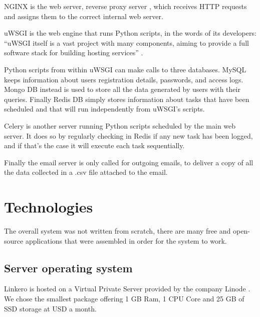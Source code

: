 NGINX is the web server, reverse proxy server \cite{WikiNginx}, which receives
HTTP requests and assigns them to the correct internal web server.

uWSGI is the web engine that runs Python scripts, in the words of its
developers: ``uWSGI itself is a vast project with many components, aiming to
provide a full software stack for building hosting services'' \cite{RtduWsgi}.

Python scripts from within uWSGI can make calls to three databases. MySQL keeps
information about users registration details, passwords, and access logs. Mongo
DB instead is used to store all the data generated by users with their queries.
Finally Redis DB simply stores information about tasks that have been scheduled
and that will run independently from uWSGI's scripts.

Celery is another server running Python scripts scheduled by the main web
server. It does so by regularly checking in Redis if any new task has been
logged, and if that's the case it will execute each task sequentially.

Finally the email server is only called for outgoing emails, to deliver a copy
of all the data collected in a .csv file attached to the email.

\section{Technologies}

The overall system was not written from scratch, there are many free and
open-source applications that were assembled in order for the system to work.

\subsection{Server operating system}
Linkero is hosted on a Virtual Private Server provided by the company Linode
\texttrademark. We chose the smallest package offering 1 GB Ram, 1 CPU Core and
25 GB of SSD storage at  USD a month.

